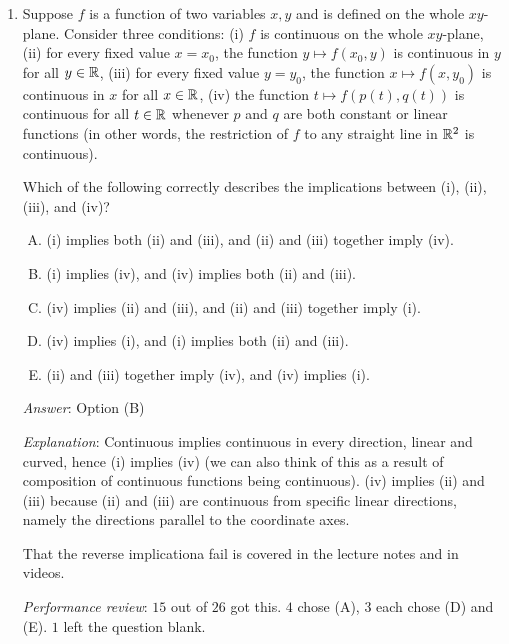 \documentclass[10pt]{amsart}
\begin{document}
\begin{enumerate}
  {\em Answer}: Option (B)

  {\em Explanation}: The sum of the absolute values of the coordinates
  of a vector is small if and only if all the absolute values of the
  coordinates are small. Similarly, the maximum of the absolute values
  of the coordinates is small if and only if all the coordinates are
  small. On the other hand, the minimum could be small even if some of
  the coordinates are very large. For this reason, the minimum does
  not capture the correct notion of ``closeness'' -- in the notion of
  closeness it gives, very far-away points can appear close merely
  because they are close in one coordinate.

  {\em Performance review}: $9$ out of $26$ people got this. $16$
  chose (C), $1$ chose (D).

\item Suppose $f$ is a function of two variables $x,y$ and is defined
  on the whole $xy$-plane. Consider three conditions: (i) $f$ is
  continuous on the whole $xy$-plane, (ii) for every fixed value $x =
  x_0$, the function $y \mapsto f(x_0,y)$ is continuous in $y$ for all
  $y \in \mathbb{R}$, (iii) for every fixed value $y = y_0$, the function $x
  \mapsto f(x,y_0)$ is continuous in $x$ for all $x \in \mathbb{R}$, (iv) the
  function $t \mapsto f(p(t),q(t))$ is continuous for all $t \in \mathbb{R}$
  whenever $p$ and $q$ are both constant or linear functions (in other
  words, the restriction of $f$ to any straight line in $\mathbb{R}^2$ is
  continuous).

  Which of the following correctly describes the implications between
  (i), (ii), (iii), and (iv)?

  \begin{enumerate}[(A)]
  \item (i) implies both (ii) and (iii), and (ii) and (iii) together imply (iv).
  \item (i) implies (iv), and (iv) implies both (ii) and (iii).
  \item (iv) implies (ii) and (iii), and (ii) and (iii) together imply (i).
  \item (iv) implies (i), and (i) implies both (ii) and (iii).
  \item (ii) and (iii) together imply (iv), and (iv) implies (i).
  \end{enumerate}
 
  {\em Answer}: Option (B)

  {\em Explanation}: Continuous implies continuous in every direction,
  linear and curved, hence (i) implies (iv) (we can also think of this
  as a result of composition of continuous functions being
  continuous). (iv) implies (ii) and (iii) because (ii) and (iii) are
  continuous from specific linear directions, namely the directions
  parallel to the coordinate axes.

  That the reverse implicationa fail is covered in the lecture notes
  and in videos.

  {\em Performance review}: $15$ out of $26$ got this. $4$ chose (A),
  $3$ each chose (D) and (E). $1$ left the question blank.
\end{enumerate}
\end{document}
